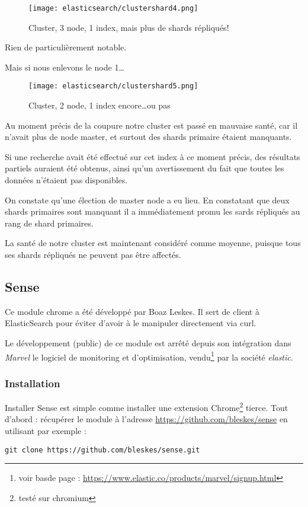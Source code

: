 \begin{figure}[H]
\center
\texttt{[image: elasticsearch/clustershard4.png]}
\label{fig:clustershard4}
\caption{Cluster, 3 node, 1 index, mais plus de shards répliqués!}
\end{figure}


Rien de particulièrement notable.

Mais si nous enlevons le node 1\ldots

\begin{figure}[H]
\center
\texttt{[image: elasticsearch/clustershard5.png]}
\label{fig:clustershard5}
\caption{Cluster, 2 node, 1 index encore\ldots ou pas}
\end{figure}

Au moment précis de la coupure notre cluster est passé en mauvaise santé, car il 
n'avait plus de node master, et surtout des shards primaire étaient manquants.

Si une recherche avait été effectué sur cet index à ce moment précis, des résultats partiels
auraient été obtenus, ainsi qu'un avertissement du fait que toutes les données n'étaient
pas disponibles.

On constate qu'une élection de master node a eu lieu. En constatant que deux shards 
primaires sont manquant il a immédiatement promu les sards répliqués au rang de 
shard primaires.

La santé de notre cluster est maintenant considéré comme moyenne, puisque tous ses
shards répliqués ne peuvent pas être affectés.



\subsection{Sense}
\label{subsec:elasticsense}
Ce module chrome a été développé par Boaz Leskes. Il sert de client à ElasticSearch
pour éviter d'avoir à le manipuler directement via curl.

Le développement (public) de ce module est arrêté depuis son intégration dans \emph{Marvel} 
le logiciel de monitoring et d'optimisation, vendu\footnote{voir basde page : 
\url{https://www.elastic.co/products/marvel/signup.html}} par la société \emph{elastic}.


\subsubsection{Installation}
Installer Sense est simple comme installer une extension 
Chrome\footnote{testé sur chromium} tierce.
Tout d'abord : récupérer le module à l'adresse \url{https://github.com/bleskes/sense}
en utilisant par exemple : 
\begin{lstlisting}[style=code,label=lst:gitclonesense]
git clone https://github.com/bleskes/sense.git
\end{lstlisting}

